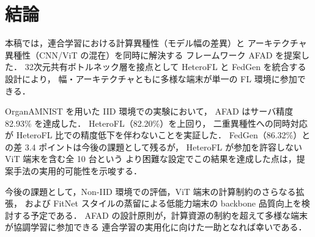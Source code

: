 \section{結論}

本稿では，連合学習における計算異種性（モデル幅の差異）と
アーキテクチャ異種性（CNN/ViT の混在）を同時に解決する
フレームワーク AFAD を提案した．
32次元共有ボトルネック層を接点として HeteroFL と FedGen を統合する設計により，
幅・アーキテクチャともに多様な端末が単一の FL 環境に参加できる．

OrganAMNIST を用いた IID 環境での実験において，
AFAD はサーバ精度 82.93\% を達成した．
HeteroFL（82.20\%）を上回り，
二重異種性への同時対応が HeteroFL 比での精度低下を伴わないことを実証した．
FedGen（86.32\%）との差 3.4 ポイントは今後の課題として残るが，
HeteroFL が参加を許容しない ViT 端末を含む全 10 台という
より困難な設定でこの結果を達成した点は，提案手法の実用的可能性を示唆する．

今後の課題として，Non-IID 環境での評価，ViT 端末の計算制約のさらなる拡張，
および FitNet スタイルの蒸留による低能力端末の backbone 品質向上を検討する予定である．
AFAD の設計原則が，計算資源の制約を超えて多様な端末が協調学習に参加できる
連合学習の実用化に向けた一助となれば幸いである．

